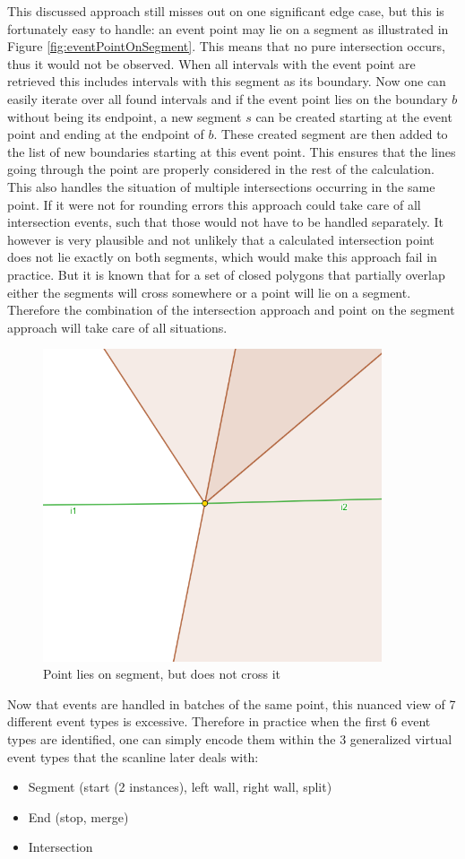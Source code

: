 \documentclass[12pt]{article}
\begin{document}
This discussed approach still misses out on one significant edge case, but this is fortunately easy to handle: an event point may lie on a segment as illustrated in Figure \ref{fig:eventPointOnSegment}. This means that no pure intersection occurs, thus it would not be observed. When all intervals with the event point are retrieved this includes intervals with this segment as its boundary. Now one can easily iterate over all found intervals and if the event point lies on the boundary $b$ without being its endpoint, a new segment $s$ can be created starting at the event point and ending at the endpoint of $b$. These created segment are then added to the list of new boundaries starting at this event point. This ensures that the lines going through the point are properly considered in the rest of the calculation. This also handles the situation of multiple intersections occurring in the same point. If it were not for rounding errors this approach could take care of all intersection events, such that those would not have to be handled separately. It however is very plausible and not unlikely that a calculated intersection point does not lie exactly on both segments, which would make this approach fail in practice. But it is known that for a set of closed polygons that partially overlap either the segments will cross somewhere or a point will lie on a segment. Therefore the combination of the intersection approach and point on the segment approach will take care of all situations.
\begin{figure}[H]
    \centering
    \includegraphics[width=10cm]{Images/intersection_pointOnSegment.png}
    \caption{Point lies on segment, but does not cross it}
    \label{fig:intersectionScanline}
\end{figure}

Now that events are handled in batches of the same point, this nuanced view of 7 different event types is excessive. Therefore in practice when the first 6 event types are identified, one can simply encode them within the 3 generalized virtual event types that the scanline later deals with:
\begin{itemize}
    \item Segment (start (2 instances), left wall, right wall, split)
    \item End (stop, merge)
    \item Intersection
\end{itemize}
\end{document}
